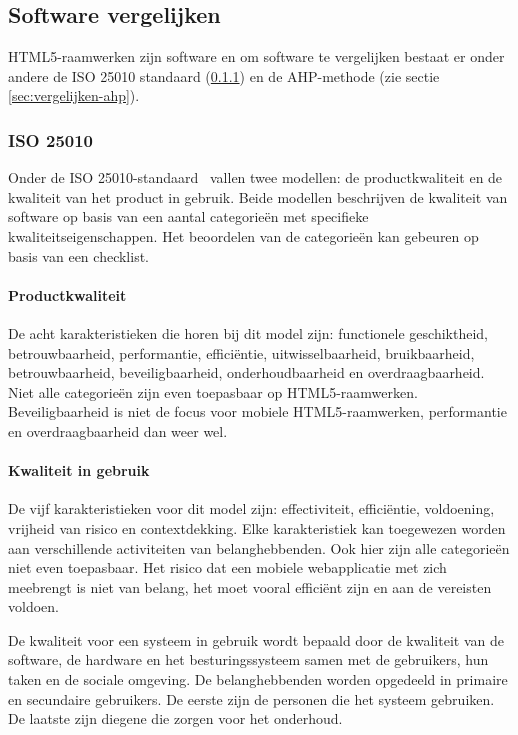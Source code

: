 \subsection{Software vergelijken}
HTML5-raamwerken zijn software en om software te vergelijken bestaat er onder andere de ISO 25010 standaard (\ref{sec:vergelijken-iso}) en de AHP-methode (zie sectie \ref{sec:vergelijken-ahp}).  


\subsubsection{ISO 25010}
\label{sec:vergelijken-iso}
Onder de ISO 25010-standaard~\cite{Standard2010} vallen twee modellen:  de productkwaliteit en de kwaliteit van het product in gebruik.  
Beide modellen beschrijven de kwaliteit van software op basis van een aantal categorieën met specifieke kwaliteitseigenschappen. 
Het beoordelen van de categorieën kan gebeuren op basis van een checklist. 
 
\paragraph{Productkwaliteit}
De acht karakteristieken die horen bij dit model zijn: functionele geschiktheid,  betrouwbaarheid,  performantie, efficiëntie, uitwisselbaarheid,  bruikbaarheid,  betrouwbaarheid, beveiligbaarheid,  onderhoudbaarheid en overdraagbaarheid.   
Niet alle categorieën zijn even toepasbaar op HTML5-raamwerken.  
Beveiligbaarheid is niet de focus voor mobiele HTML5-raamwerken,  performantie en overdraagbaarheid dan weer wel.

\paragraph{Kwaliteit in gebruik}
De vijf karakteristieken voor dit model zijn: effectiviteit,  efficiëntie,  voldoening,  vrijheid van risico en contextdekking. 
Elke karakteristiek kan toegewezen worden aan verschillende activiteiten van belanghebbenden. 
Ook hier zijn alle categorieën niet even toepasbaar.  
Het risico dat een mobiele webapplicatie met zich meebrengt is niet van belang,  het moet vooral efficiënt zijn en aan de vereisten voldoen.

De kwaliteit voor een systeem in gebruik wordt bepaald door de kwaliteit van de software,  de hardware en het besturingssysteem samen met de gebruikers, hun taken en de sociale omgeving.  
De belanghebbenden worden opgedeeld in primaire en secundaire gebruikers.  
De eerste zijn de personen die het systeem gebruiken. 
De laatste zijn diegene die zorgen voor het onderhoud.

